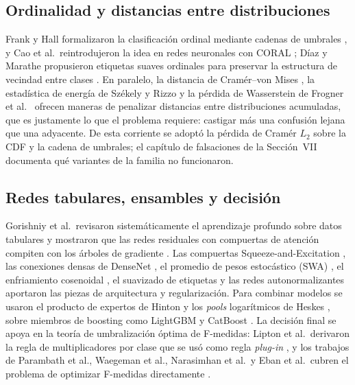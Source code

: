 \documentclass[journal]{IEEEtai}
\begin{document}
\subsection{Ordinalidad y distancias entre distribuciones}

Frank y Hall formalizaron la clasificaci\'on ordinal mediante cadenas de umbrales \cite{frank2001}, y Cao et al.\ reintrodujeron la idea en redes neuronales con CORAL \cite{cao2020}; D\'iaz y Marathe propusieron etiquetas suaves ordinales para preservar la estructura de vecindad entre clases \cite{diaz2019}. En paralelo, la distancia de Cram\'er--von Mises \cite{cramer1928,vonmises1931}, la estad\'istica de energ\'ia de Sz\'ekely y Rizzo \cite{szekely2013} y la p\'erdida de Wasserstein de Frogner et al.\ \cite{frogner2015} ofrecen maneras de penalizar distancias entre distribuciones acumuladas, que es justamente lo que el problema requiere: castigar m\'as una confusi\'on lejana que una adyacente. De esta corriente se adopt\'o la p\'erdida de Cram\'er $L_2$ sobre la CDF y la cadena de umbrales; el cap\'itulo de falsaciones de la Secci\'on~VII documenta qu\'e variantes de la familia no funcionaron.

\subsection{Redes tabulares, ensambles y decisi\'on}

Gorishniy et al.\ revisaron sistem\'aticamente el aprendizaje profundo sobre datos tabulares y mostraron que las redes residuales con compuertas de atenci\'on compiten con los \'arboles de gradiente \cite{gorishniy2021}. Las compuertas Squeeze-and-Excitation \cite{hu2018}, las conexiones densas de DenseNet \cite{huang2017}, el promedio de pesos estoc\'astico (SWA) \cite{izmailov2018}, el enfriamiento cosenoidal \cite{loshchilov2017}, el suavizado de etiquetas \cite{szegedy2016,muller2019} y las redes autonormalizantes \cite{klambauer2017} aportaron las piezas de arquitectura y regularizaci\'on. Para combinar modelos se usaron el producto de expertos de Hinton \cite{hinton2002} y los \textit{pools} logar\'itmicos de Heskes \cite{heskes1998}, sobre miembros de boosting como LightGBM \cite{ke2017} y CatBoost \cite{prokhorenkova2018}. La decisi\'on final se apoya en la teor\'ia de umbralizaci\'on \'optima de F-medidas: Lipton et al.\ derivaron la regla de multiplicadores por clase que se us\'o como regla \textit{plug-in} \cite{lipton2014}, y los trabajos de Parambath et al., Waegeman et al., Narasimhan et al.\ y Eban et al.\ cubren el problema de optimizar F-medidas directamente \cite{parambath2014,waegeman2014,narasimhan2015,eban2017}.
\end{document}
